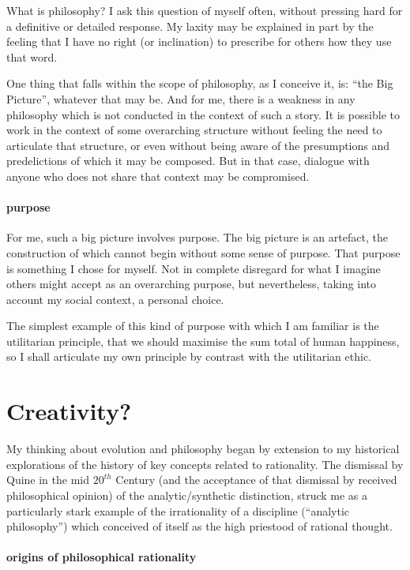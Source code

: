 \documentclass[10pt,titlepage]{book}
\begin{document}
What is philosophy?
I ask this question of myself often, without pressing hard for a definitive or detailed response.
My laxity may be explained in part by the feeling that I have no right (or inclination) to prescribe for others how they use that word.

One thing that falls within the scope of philosophy, as I conceive it, is: ``the Big Picture'', whatever that may be.
And for me, there is a weakness in any philosophy which is not conducted in the context of such a story.
It is possible to work in the context of some overarching structure without feeling the need to articulate that structure, or even without being aware of the presumptions and predelictions of which it may be composed.
But in that case, dialogue with anyone who does not share that context may be compromised.

\paragraph{purpose}

For me, such a big picture involves purpose.
The big picture is an artefact, the construction of which cannot begin without some sense of purpose.
That purpose is something I chose for myself.
Not in complete disregard for what I imagine others might accept as an overarching purpose, but nevertheless, taking into account my social context, a personal choice.

The simplest example of this kind of purpose with which I am familiar is the utilitarian principle, that we should maximise the sum total of human happiness, so I shall articulate my own principle by contrast with the utilitarian ethic.

\section{Creativity?}

My thinking about evolution and philosophy began by extension to my historical explorations of the history of key concepts related to rationality.
The dismissal by Quine in the mid $20^{th}$ Century (and the acceptance of that dismissal by received philosophical opinion) of the analytic/synthetic distinction, struck me as a particularly stark example of the irrationality of a discipline (``analytic philosophy'') which conceived of itself as the high priestood of rational thought.

\paragraph{origins of philosophical rationality}~\\
\end{document}
